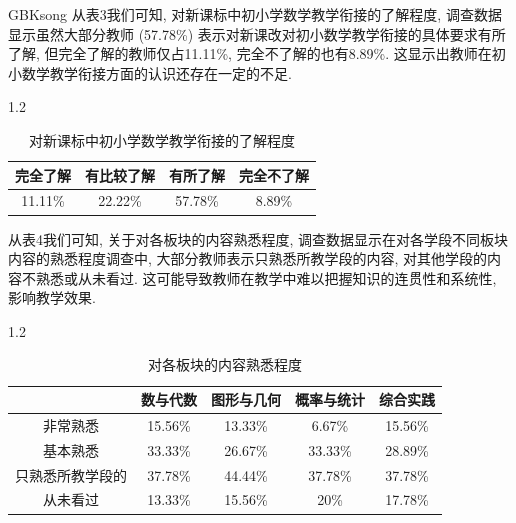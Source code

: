 \documentclass[a4paper,12pt,twoside]{ctexart}
\begin{document}
\begin{CJK*}{GBK}{song}
  从表3我们可知, 对新课标中初小学数学教学衔接的了解程度, 调查数据显示虽然大部分教师 (57.78\%) 表示对新课改对初小数学教学衔接的具体要求有所了解, 但完全了解的教师仅占11.11\%, 完全不了解的也有8.89\%. 这显示出教师在初小数学教学衔接方面的认识还存在一定的不足.\vspace*{-15pt}
  \begin{spacing}{1.2}
  \begin{table}[H]\centering
 \caption{\label{tabrecord}对新课标中初小学数学教学衔接的了解程度}\medskip
\begin{tabular}{|c|c|c|c|}
\hline
完全了解    & 有比较了解    & 有所了解     & 完全不了解   \\ \hline
11.11\% & 22.22\% & 57.78\% & 8.89\% \\ \hline
\end{tabular}
\end{table}\vspace*{-8pt}
\end{spacing}

从表4我们可知, 关于对各板块的内容熟悉程度, 调查数据显示在对各学段不同板块内容的熟悉程度调查中, 大部分教师表示只熟悉所教学段的内容, 对其他学段的内容不熟悉或从未看过. 这可能导致教师在教学中难以把握知识的连贯性和系统性, 影响教学效果.
\begin{spacing}{1.2}\vspace*{-15pt}
\begin{table}[H]
\center
\caption{\label{tabrecord}对各板块的内容熟悉程度}\medskip
\begin{tabular}{|c|c|c|c|c|}
\hline
         & 数与代数    & 图形与几何   & 概率与统计   & 综合实践    \\ \hline
非常熟悉     & 15.56\% & 13.33\% & 6.67\%  & 15.56\% \\ \hline
基本熟悉     & 33.33\% & 26.67\% & 33.33\% & 28.89\% \\ \hline
只熟悉所教学段的 & 37.78\% & 44.44\% & 37.78\% & 37.78\% \\ \hline
从未看过     & 13.33\% & 15.56\% & 20\%     & 17.78\% \\ \hline
\end{tabular}
\end{table}\vspace*{-8pt}
\end{spacing}


\end{CJK*}
\end{document}
